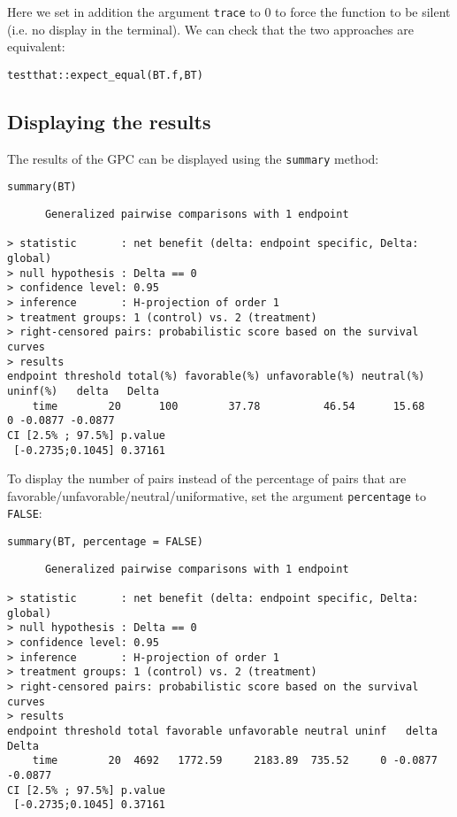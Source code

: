 \documentclass[12pt]{article}
\begin{document}
Here we set in addition the argument \texttt{trace} to 0 to force the
function to be silent (i.e. no display in the terminal). We can check
that the two approaches are equivalent:
\lstset{language=r,label= ,caption= ,captionpos=b,numbers=none}
\begin{lstlisting}
testthat::expect_equal(BT.f,BT)
\end{lstlisting}

\subsection{Displaying the results}
\label{sec:orgd47fa04}

The results of the GPC can be displayed using the \texttt{summary} method:
\lstset{language=r,label= ,caption= ,captionpos=b,numbers=none}
\begin{lstlisting}
summary(BT)
\end{lstlisting}

\begin{verbatim}
      Generalized pairwise comparisons with 1 endpoint

> statistic       : net benefit (delta: endpoint specific, Delta: global) 
> null hypothesis : Delta == 0 
> confidence level: 0.95 
> inference       : H-projection of order 1
> treatment groups: 1 (control) vs. 2 (treatment) 
> right-censored pairs: probabilistic score based on the survival curves
> results
endpoint threshold total(%) favorable(%) unfavorable(%) neutral(%) uninf(%)   delta   Delta
    time        20      100        37.78          46.54      15.68        0 -0.0877 -0.0877
CI [2.5% ; 97.5%] p.value 
 [-0.2735;0.1045] 0.37161
\end{verbatim}

\clearpage

 To display the number of pairs instead of the percentage of pairs
that are favorable/unfavorable/neutral/uniformative, set the argument
\texttt{percentage} to \texttt{FALSE}:
\lstset{language=r,label= ,caption= ,captionpos=b,numbers=none}
\begin{lstlisting}
summary(BT, percentage = FALSE)
\end{lstlisting}

\begin{verbatim}
      Generalized pairwise comparisons with 1 endpoint

> statistic       : net benefit (delta: endpoint specific, Delta: global) 
> null hypothesis : Delta == 0 
> confidence level: 0.95 
> inference       : H-projection of order 1
> treatment groups: 1 (control) vs. 2 (treatment) 
> right-censored pairs: probabilistic score based on the survival curves
> results
endpoint threshold total favorable unfavorable neutral uninf   delta   Delta
    time        20  4692   1772.59     2183.89  735.52     0 -0.0877 -0.0877
CI [2.5% ; 97.5%] p.value 
 [-0.2735;0.1045] 0.37161
\end{verbatim}
\end{document}
